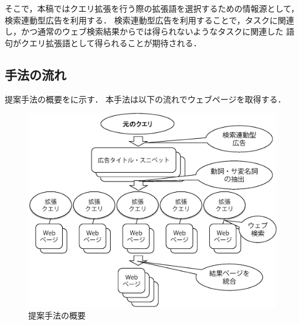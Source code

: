\documentclass[submit,techreq]{ipsj}
\begin{document}
そこで，本稿ではクエリ拡張を行う際の拡張語を選択するための情報源として，
検索連動型広告を利用する．
検索連動型広告を利用することで，タスクに関連し，かつ通常のウェブ検索結果からでは得られないようなタスクに関連した
語句がクエリ拡張語として得られることが期待される．

%
%
%
%



\subsection{手法の流れ}
\label{sec:flow}
提案手法の概要をに示す．
本手法は以下の流れでウェブページを取得する．

\begin{figure}[t]
\centering
\includegraphics[width=0.75\hsize]{method.eps}
\caption{提案手法の概要}
\label{fig:overview_method2}
\vspace{-2em}
\end{figure}
\end{document}
